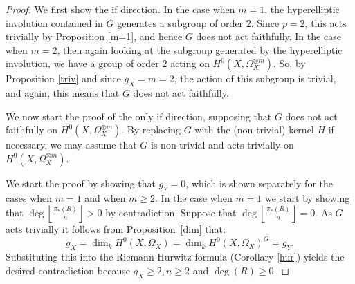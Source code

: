     \begin{proof}
    We first show the if direction. 
    In the case when $m=1$, the hyperelliptic involution contained in $G$ generates a subgroup of order $2$.
    Since $p=2$, this acts trivially by Proposition \ref{m=1}, and hence $G$ does not act faithfully.
    In the case when $m=2$, then again looking at the subgroup generated by the hyperelliptic involution, we have a group of order $2$ acting on $H^0(X,\Omega_X^{\otimes m})$.
    So, by Proposition \ref{triv} and since $g_X=m=2$, the action of this subgroup is trivial, and again, this means that $G$ does not act faithfully.
    
    
    We now start the proof of the only if direction, supposing that $G$ does not act faithfully on $H^0(X,\Omega_X^{\otimes m})$. 
    By replacing $G$ with the (non-trivial) kernel $H$ if necessary, we may assume that $G$ is non-trivial and acts trivially on $H^0(X,\Omega_X^{\otimes m})$.
    
    
    We start the proof by showing that $g_Y=0$, which is shown separately for the cases when $m=1$ and when $m\geq 2$.
    In the case when $m=1$ we start by showing that $\deg  \left\lfloor \frac {\pi_*(R)}{n} \right\rfloor >0$ by contradiction.
    Suppose that $\deg\left\lfloor \frac{\pi_*(R)}{n} \right\rfloor =0$.
    As $G$ acts trivially it follows from Proposition~\ref{dim} that:
        \begin{equation*}
        g_X=\dim_k H^0(X,\Omega_X)=\dim_k H^0(X,\Omega_X)^G=g_Y.
        \end{equation*}
    Substituting this into the Riemann-Hurwitz formula (Corollary \ref{hur}) yields the desired contradiction because $g_X\geq 2, n\geq 2$ and $\deg(R)\geq 0$.
    

\end{proof}
